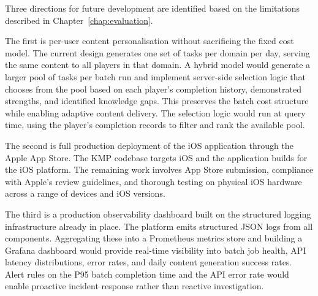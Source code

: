 Three directions for future development are identified based on the limitations described in Chapter~\ref{chap:evaluation}.

The first is per-user content personalisation without sacrificing the fixed cost model. The current design generates one set of tasks per domain per day, serving the same content to all players in that domain. A hybrid model would generate a larger pool of tasks per batch run and implement server-side selection logic that chooses from the pool based on each player's completion history, demonstrated strengths, and identified knowledge gaps. This preserves the batch cost structure while enabling adaptive content delivery. The selection logic would run at query time, using the player's completion records to filter and rank the available pool.

The second is full production deployment of the iOS application through the Apple App Store. The KMP codebase targets iOS and the application builds for the iOS platform. The remaining work involves App Store submission, compliance with Apple's review guidelines, and thorough testing on physical iOS hardware across a range of devices and iOS versions.

The third is a production observability dashboard built on the structured logging infrastructure already in place. The platform emits structured JSON logs from all components. Aggregating these into a Prometheus metrics store and building a Grafana dashboard would provide real-time visibility into batch job health, API latency distributions, error rates, and daily content generation success rates. Alert rules on the P95 batch completion time and the API error rate would enable proactive incident response rather than reactive investigation.
